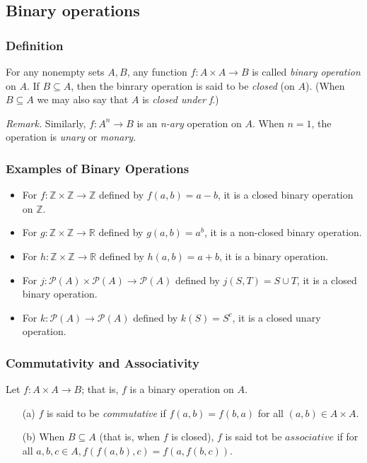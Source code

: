 \documentclass[11pt]{article}
\begin{document}
    \subsection{Binary operations}
    \subsubsection{Definition}

    For any nonempty sets \(A,B\), any function \(f: A \times A \rightarrow B\) is called \emph{binary operation} on $A$. If \(B \subseteq A\), then the binrary operation is said to be \emph{closed} (on $A$). (When \(B \subseteq A\) we may also say that $A$ is \emph{closed under f}.)

    \vspace{1em}

    \emph{Remark.} Similarly, \(f : A^n \rightarrow B\) is an \emph{n-ary} operation on $A$. When $n=1$, the operation is \emph{unary} or \emph{monary}.

    \subsubsection{Examples of Binary Operations}
    \begin{itemize}
        \item For \(f: \mathbb{Z} \times \mathbb{Z} \rightarrow \mathbb{Z}\) defined by \(f(a,b) = a - b\), it is a closed binary operation on \(\mathbb{Z}\).
        \item For \(g: \mathbb{Z} \times \mathbb{Z} \rightarrow \mathbb{R}\) defined by \(g(a,b) = a^b\), it is a non-closed binary operation.
        \item For \(h: \mathbb{Z} \times \mathbb{Z} \rightarrow \mathbb{R}\) defined by \(h(a,b) = a + b\), it is a binary operation.
        \item For \(j: \mathcal{P}(A) \times \mathcal{P}(A) \rightarrow \mathcal{P}(A)\) defined by \(j(S,T) = S \cup T\), it is a closed binary operation.
        \item For \(k: \mathcal{P}(A) \rightarrow \mathcal{P}(A)\) defined by \(k(S) = S^c\), it is a closed unary operation.
    \end{itemize}

    \subsubsection{Commutativity and Associativity}
    Let \(f: A \times A \rightarrow B\); that is, $f$ is a binary operation on $A$.
    \begin{enumerate}
        \item[(a)] $f$ is said to be \emph{commutative} if \(f(a,b) = f(b,a)\) for all \((a,b) \in A \times A.\)
        \item[(b)] When \(B \subseteq A\) (that is, when $f$ is closed), $f$ is said tot be $associative$ if for all \(a,b,c \in A, f(f(a,b),c) = f(a,f(b,c)).\)  
    \end{enumerate}
\end{document}
